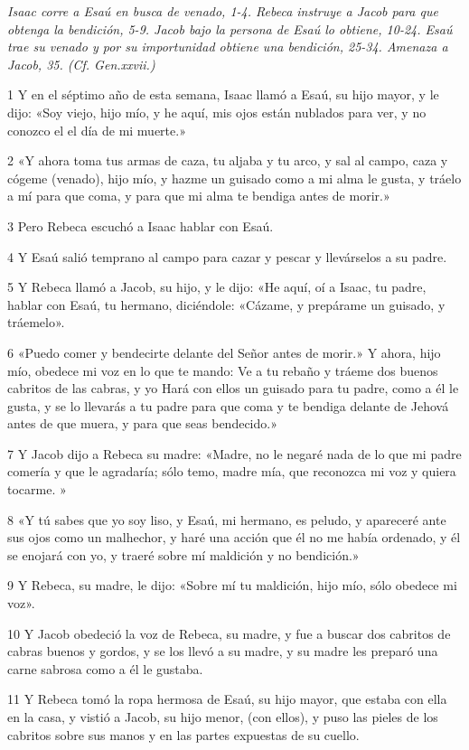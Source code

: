 \textit{Isaac corre a Esaú en busca de venado, 1-4. Rebeca instruye a Jacob para que obtenga la bendición, 5-9. Jacob bajo la persona de Esaú lo obtiene, 10-24. Esaú trae su venado y por su importunidad obtiene una bendición, 25-34. Amenaza a Jacob, 35. (Cf. Gen.xxvii.)}

\par 1 Y en el séptimo año de esta semana, Isaac llamó a Esaú, su hijo mayor, y le dijo: «Soy viejo, hijo mío, y he aquí, mis ojos están nublados para ver, y no conozco el el día de mi muerte.»
\par 2 «Y ahora toma tus armas de caza, tu aljaba y tu arco, y sal al campo, caza y cógeme (venado), hijo mío, y hazme un guisado como a mi alma le gusta, y tráelo a mí para que coma, y ​​para que mi alma te bendiga antes de morir.»
\par 3 Pero Rebeca escuchó a Isaac hablar con Esaú.
\par 4 Y Esaú salió temprano al campo para cazar y pescar y llevárselos a su padre.
\par 5 Y Rebeca llamó a Jacob, su hijo, y le dijo: «He aquí, oí a Isaac, tu padre, hablar con Esaú, tu hermano, diciéndole: «Cázame, y prepárame un guisado, y tráemelo».
\par 6 «Puedo comer y bendecirte delante del Señor antes de morir.» Y ahora, hijo mío, obedece mi voz en lo que te mando: Ve a tu rebaño y tráeme dos buenos cabritos de las cabras, y yo Hará con ellos un guisado para tu padre, como a él le gusta, y se lo llevarás a tu padre para que coma y te bendiga delante de Jehová antes de que muera, y para que seas bendecido.»
\par 7 Y Jacob dijo a Rebeca su madre: «Madre, no le negaré nada de lo que mi padre comería y que le agradaría; sólo temo, madre mía, que reconozca mi voz y quiera tocarme. »
\par 8 «Y tú sabes que yo soy liso, y Esaú, mi hermano, es peludo, y apareceré ante sus ojos como un malhechor, y haré una acción que él no me había ordenado, y él se enojará con yo, y traeré sobre mí maldición y no bendición.»
\par 9 Y Rebeca, su madre, le dijo: «Sobre mí tu maldición, hijo mío, sólo obedece mi voz».
\par 10 Y Jacob obedeció la voz de Rebeca, su madre, y fue a buscar dos cabritos de cabras buenos y gordos, y se los llevó a su madre, y su madre les preparó una carne sabrosa como a él le gustaba.
\par 11 Y Rebeca tomó la ropa hermosa de Esaú, su hijo mayor, que estaba con ella en la casa, y vistió a Jacob, su hijo menor, (con ellos), y puso las pieles de los cabritos sobre sus manos y en las partes expuestas de su cuello.

